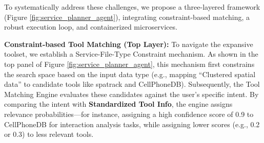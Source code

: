 \documentclass[a4,center,fleqn]{NAR}
\begin{document}




To systematically address these challenges, we propose a three-layered framework (Figure \ref{fig:service_planner_agent}), integrating constraint-based matching, a robust execution loop, and containerized microservices.

\textbf{Constraint-based Tool Matching (Top Layer):} To navigate the expansive toolset, we establish a Service-File-Type Constraint mechanism. As shown in the top panel of Figure \ref{fig:service_planner_agent}, this mechanism first constrains the search space based on the input data type (e.g., mapping ``Clustered spatial data'' to candidate tools like spatrack and CellPhoneDB). Subsequently, the Tool Matching Engine evaluates these candidates against the user's specific intent. By comparing the intent with \textbf{Standardized Tool Info}, the engine assigns relevance probabilities—for instance, assigning a high confidence score of 0.9 to CellPhoneDB for interaction analysis tasks, while assigning lower scores (e.g., 0.2 or 0.3) to less relevant tools.
\end{document}
